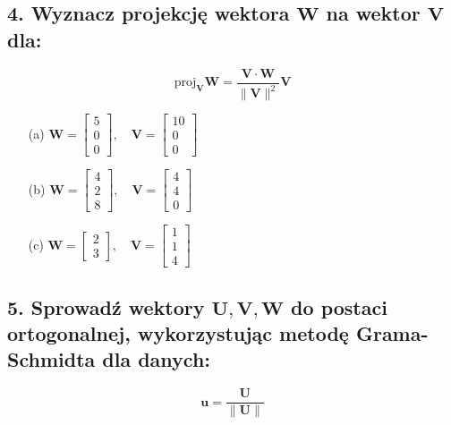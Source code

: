 \subsection*{4. Wyznacz projekcję wektora $\mathbf{W}$ na wektor $\mathbf{V}$ dla:}

\[
\text{proj}_{\mathbf{V}} \mathbf{W} = \frac{\mathbf{V} \cdot \mathbf{W}}{\|\mathbf{V}\|^2} \mathbf{V}
\]


\begin{enumerate}
    \item[(a)] $\mathbf{W} = \begin{bmatrix} 5 \\ 0 \\ 0 \end{bmatrix}, \quad
    \mathbf{V} = \begin{bmatrix} 10 \\ 0 \\ 0 \end{bmatrix}$
    
    \item[(b)] $\mathbf{W} = \begin{bmatrix} 4 \\ 2 \\ 8 \end{bmatrix}, \quad
    \mathbf{V} = \begin{bmatrix} 4 \\ 4 \\ 0 \end{bmatrix}$
    
    \item[(c)] $\mathbf{W} = \begin{bmatrix} 2 \\ 3 \end{bmatrix}, \quad
    \mathbf{V} = \begin{bmatrix} 1 \\ 1 \\ 4 \end{bmatrix}$
\end{enumerate}




\subsection*{5. Sprowadź wektory $\mathbf{U}, \mathbf{V}, \mathbf{W}$ do postaci ortogonalnej, wykorzystując metodę Grama-Schmidta dla danych:}

\[
\mathbf{u} = \frac{\mathbf{U}}{\|\mathbf{U}\|}
\]


